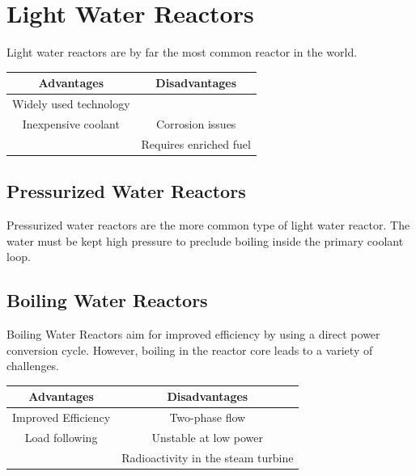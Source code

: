\section{Light Water Reactors}
Light water reactors are by far the most common reactor in the world. 
\begin{table}[!h]
\begin{tabular}{c|c}
  Advantages & Disadvantages \\
  \hline
  Widely used technology &  \\
  Inexpensive coolant & Corrosion issues \\
   & Requires enriched fuel \\
\end{tabular}
\end{table}

\subsection{Pressurized Water Reactors}
Pressurized water reactors are the more common type of light water reactor. The water must be kept high pressure to preclude boiling inside the primary coolant loop.

\subsection{Boiling Water Reactors}
Boiling Water Reactors aim for improved efficiency by using a direct power conversion cycle. However, boiling in the reactor core leads to a variety of challenges. 
\begin{table}[!h]
\begin{tabular}{c|c}
  Advantages & Disadvantages \\
  \hline
  Improved Efficiency & Two-phase flow \\
  Load following & Unstable at low power\\
   & Radioactivity in the steam turbine\\
\end{tabular}
\end{table}


